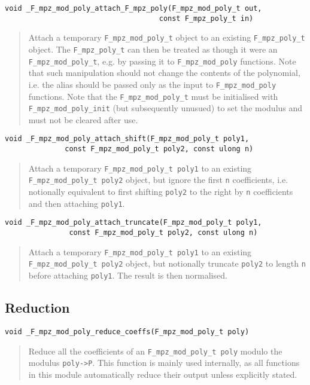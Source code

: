 \documentclass[a4paper,10pt]{article}
\newcommand{\code}{\lstinline}
\begin{document}
\begin{lstlisting}
void _F_mpz_mod_poly_attach_F_mpz_poly(F_mpz_mod_poly_t out, 
                                    const F_mpz_poly_t in)
\end{lstlisting}
\begin{quote}
Attach a temporary \code{F_mpz_mod_poly_t} object to an existing \code{F_mpz_poly_t} object. The 
\code{F_mpz_poly_t} can then be treated as though it were an \code{F_mpz_mod_poly_t}, e.g. by 
passing it to \code{F_mpz_mod_poly} functions. Note that such manipulation should not change the contents
of the polynomial, i.e. the alias should be passed only as the input to \code{F_mpz_mod_poly} functions.
Note that the \code{F_mpz_mod_poly_t} must be initialised with \code{F_mpz_mod_poly_init} (but subsequently
unusued) to set the modulus and must not be cleared after use. 
\end{quote}

\begin{lstlisting}
void _F_mpz_mod_poly_attach_shift(F_mpz_mod_poly_t poly1, 
              const F_mpz_mod_poly_t poly2, const ulong n)
\end{lstlisting}
\begin{quote}
Attach a temporary \code{F_mpz_mod_poly_t poly1} to an existing \code{F_mpz_mod_poly_t poly2} object, but
ignore the first \code{n} coefficients, i.e. notionally equivalent to first shifting \code{poly2} to the
right by \code{n} coefficients and then attaching \code{poly1}.
\end{quote}

\begin{lstlisting}
void _F_mpz_mod_poly_attach_truncate(F_mpz_mod_poly_t poly1, 
               const F_mpz_mod_poly_t poly2, const ulong n)
\end{lstlisting}
\begin{quote}
Attach a temporary \code{F_mpz_mod_poly_t poly1} to an existing \code{F_mpz_mod_poly_t poly2} object, but
notionally truncate \code{poly2} to length \code{n} before attaching \code{poly1}. The result is then
normalised.
\end{quote}

\subsection{Reduction}

\begin{lstlisting}
void _F_mpz_mod_poly_reduce_coeffs(F_mpz_mod_poly_t poly)
\end{lstlisting}
\begin{quote}
Reduce all the coefficients of an \code{F_mpz_mod_poly_t poly} modulo the modulus \code{poly->P}. This 
function is mainly used internally, as all functions in this module automatically reduce their output
unless explicitly stated.
\end{quote}
\end{document}
